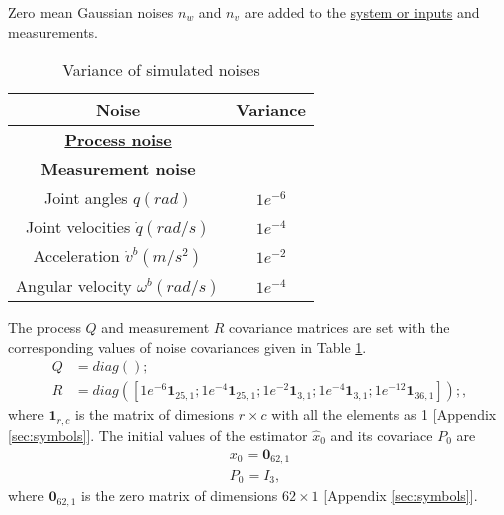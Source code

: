 Zero mean Gaussian noises $n_w$ and $n_v$ are added to the \underline{system or inputs} and measurements.
\begin{table}[H]
    \centering
    \begin{tabular}{|c|c|}
    \hline
    Noise &Variance \\ \hline
    \textbf{\underline{Process noise}} &\hspace{2mm}\\
    \hline
    \textbf{Measurement noise} &\hspace{2mm}\\
    Joint angles $q(rad)$ &$1e^{-6}$ \\ 
    Joint velocities $\dot q(rad/s)$ &$1e^{-4}$ \\
    Acceleration $\dot v^b(m/s^2)$ &$1e^{-2}$ \\ 
    Angular velocity $\omega^b(rad/s)$ &$1e^{-4}$ \\ \hline
    \end{tabular}
    \caption{Variance of simulated noises}
    \label{tab:toro_var}
\end{table}

The process $Q$ and measurement $R$ covariance matrices are set with the corresponding values of noise covariances given in Table \ref{tab:toro_var}. 
$$  \begin{aligned}
         Q &= diag();\\
         R &= diag([1e^{-6} \textbf{1}_{25,1}; 1e^{-4}\textbf{1}_{25,1}; 1e^{-2}\textbf{1}_{3,1};1e^{-4}\textbf{1}_{3,1}; 1e^{-12}\textbf{1}_{36,1} ]);,
     \end{aligned}$$
where $\textbf{1}_{r,c}$ is the matrix of dimesions $r \times c$ with all the elements as 1 [Appendix \ref{sec:symbols}]. The initial values of the estimator $\hat x_0$ and its covariace $P_0$ are 
$$ \begin{aligned} x_0 = \textbf{0}_{62,1}\\ P_0 = I_3, \end{aligned} $$  where $\textbf{0}_{62,1}$ is the zero matrix of dimensions $62 \times 1$ [Appendix \ref{sec:symbols}].

